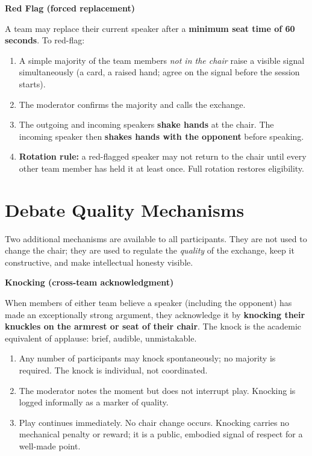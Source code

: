 \bigskip

\noindent\textbf{\enspace Red Flag (forced replacement)}

\noindent A team may replace their current speaker after a \textbf{minimum seat
time of 60 seconds}. To red-flag:

\begin{enumerate}
    \item A simple majority of the team members \textit{not in the chair} raise
          a visible signal simultaneously (a card, a raised hand; agree on
          the signal before the session starts).
    \item The moderator confirms the majority and calls the exchange.
    \item The outgoing and incoming speakers \textbf{shake hands} at the chair.
          The incoming speaker then \textbf{shakes hands with the opponent}
          before speaking.
    \item \textbf{Rotation rule:} a red-flagged speaker may not return to the
          chair until every other team member has held it at least once.
          Full rotation restores eligibility.
\end{enumerate}





\section*{Debate Quality Mechanisms}

\noindent Two additional mechanisms are available to all participants. They are
not used to change the chair; they are used to regulate the \textit{quality}
of the exchange, keep it constructive, and make intellectual honesty visible.

\bigskip

\noindent\textbf{Knocking (cross-team acknowledgment)}

\noindent When members of either team believe a speaker (including the
opponent) has made an exceptionally strong argument, they acknowledge it by
\textbf{knocking their knuckles on the armrest or seat of their chair}. The
knock is the academic equivalent of applause: brief, audible, unmistakable.

\begin{enumerate}
    \item Any number of participants may knock spontaneously; no majority
          is required. The knock is individual, not coordinated.
    \item The moderator notes the moment but does not interrupt play.
          Knocking is logged informally as a marker of quality.
    \item Play continues immediately. No chair change occurs. Knocking
          carries no mechanical penalty or reward; it is a public, embodied
          signal of respect for a well-made point.
\end{enumerate}

